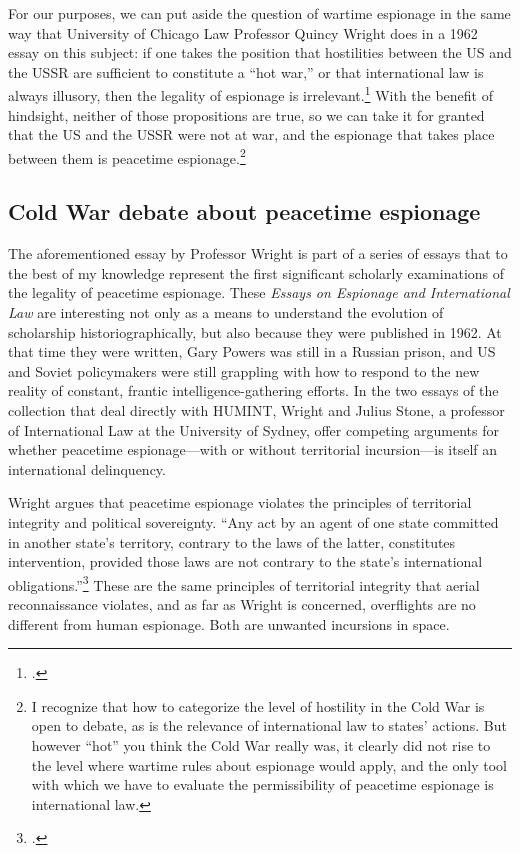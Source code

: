 \documentclass{memoir}
\begin{document}
\begin{refsegment}
For our purposes, we can put aside the question of wartime espionage in the same way that University of Chicago Law Professor Quincy Wright does in a 1962 essay on this subject: if one takes the position that hostilities between the US and the USSR are sufficient to constitute a ``hot war,'' or that international law is always illusory, then the legality of espionage is irrelevant.\footcite[p.~8]{wright_espionage_1962} With the benefit of hindsight, neither of those propositions are true, so we can take it for granted that the US and the USSR were not at war, and the espionage that takes place between them is peacetime espionage.\footnote{I recognize that how to categorize the level of hostility in the Cold War is open to debate, as is the relevance of international law to states' actions. But however ``hot'' you think the Cold War really was, it clearly did not rise to the level where wartime rules about espionage would apply, and the only tool with which we have to evaluate the permissibility of peacetime espionage is international law.}

\subsection{Cold War debate about peacetime espionage}
The aforementioned essay by Professor Wright is part of a series of essays that to the best of my knowledge represent the first significant scholarly examinations of the legality of peacetime espionage. These \emph{Essays on Espionage and International Law} are interesting not only as a means to understand the evolution of scholarship historiographically, but also because they were published in 1962. At that time they were written, Gary Powers was still in a Russian prison, and US and Soviet policymakers were still grappling with how to respond to the new reality of constant, frantic intelligence-gathering efforts. In the two essays of the collection that deal directly with HUMINT, Wright and Julius Stone, a professor of International Law at the University of Sydney, offer competing arguments for whether peacetime espionage---with or without territorial incursion---is itself an international delinquency.

Wright argues that peacetime espionage violates the principles of territorial integrity and political sovereignty. ``Any act by an agent of one state committed in another state's territory, contrary to the laws of the latter, constitutes intervention, provided those laws are not contrary to the state's international obligations.''\footcite[p.~13]{wright_espionage_1962} These are the same principles of territorial integrity that aerial reconnaissance violates, and as far as Wright is concerned, overflights are no different from human espionage. Both are unwanted incursions in space.


\end{refsegment}
\end{document}
